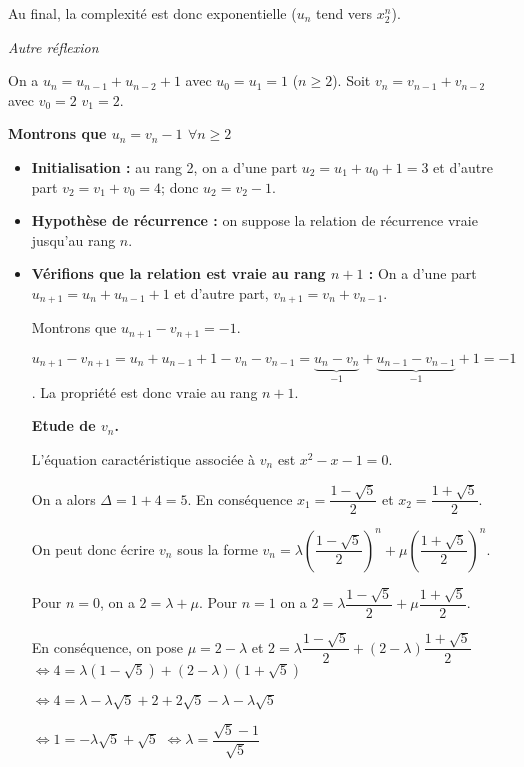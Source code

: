 \documentclass[10pt,fleqn]{article} %
\begin{document}
\begin{multicols}{2}
Au final, la complexité est donc exponentielle ($u_n$ tend vers $x_2^n$).




\vspace{2cm}
\textit{Autre réflexion}


On a $u_n = u_{n-1} + u_{n-2}+1$ avec $u_0=u_1=1$ ($n \geq 2$).
Soit $v_{n} = v_{n-1} + v_{n-2}$ avec $v_0=2$ $v_1=2$.

\textbf{Montrons que $u_n = v_n-1$ $\forall n\geq 2$}

\begin{itemize}
\item \textbf{Initialisation :} au rang 2, on a d'une part $u_2 = u_{1} + u_{0}+1=3$ et d'autre part $v_2 = v_{1} + v_{0} = 4$; donc $u_2 = v_2-1$.

\item \textbf{Hypothèse de récurrence :} on suppose la relation de récurrence vraie jusqu'au rang $n$.

\item \textbf{Vérifions que la relation est vraie au rang $n+1$ :}
On a d'une part $u_{n+1} = u_{n} + u_{n-1}+1$ et d'autre part, $v_{n+1} = v_{n} + v_{n-1}$. 

Montrons que  $u_{n+1} - v_{n+1}=-1$.

$u_{n+1} - v_{n+1} = u_{n} + u_{n-1}+1 -  v_{n}  -v_{n-1} =  \underbrace{u_{n}-  v_{n}}_{-1}+\underbrace{u_{n-1}-  v_{n-1}}_{-1}+1  =-1$. La propriété est donc vraie au rang $n+1$.


\textbf{Etude de $v_n$.}

L'équation caractéristique associée à $v_n$ est $x^2 -x -1=0$. 

On a alors $\Delta = 1+4 = 5$. En conséquence $x_1 = \dfrac{1-\sqrt{5}}{2}$ et $x_2 = \dfrac{1+\sqrt{5}}{2}$.


On peut donc écrire $v_n$ sous la forme $v_n=\lambda \left(\dfrac{1-\sqrt{5}}{2}\right)^n+\mu \left(\dfrac{1+\sqrt{5}}{2}\right)^n$.

Pour $n=0$, on a $2=\lambda+\mu$. Pour $n=1$ on a $2=\lambda \dfrac{1-\sqrt{5}}{2}+\mu \dfrac{1+\sqrt{5}}{2}$.

En conséquence, on pose $\mu=2-\lambda$ et 
$2=\lambda \dfrac{1-\sqrt{5}}{2}+\left(2-\lambda\right) \dfrac{1+\sqrt{5}}{2}$
$\Leftrightarrow 4=\lambda (1-\sqrt{5})+\left(2-\lambda\right) (1+\sqrt{5})$

$\Leftrightarrow 4=\lambda-\lambda\sqrt{5}+ 2+2\sqrt{5}-\lambda - \lambda\sqrt{5}$

$\Leftrightarrow 1=-\lambda\sqrt{5}+\sqrt{5} $
$\Leftrightarrow \lambda=\dfrac{\sqrt{5}-1}{\sqrt{5}} $


\end{itemize}
\end{multicols}
\end{document}
